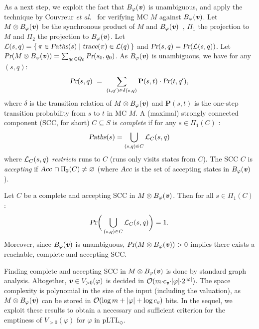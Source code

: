 \documentclass{llncs}
\newcommand{\Paths}{\mbox{\sl Paths}}
\def\Acc{\mbox{\sl Acc}}
\renewcommand{\Pr}{\mbox{\rm Pr}}
\renewcommand{\Pr}{\mbox{\sl Pr}}
\def\bfP{\mathbf{P}}
\newcommand{\set}[1]{\{ \, #1 \, \}}
\newcommand{\trace}{\mbox{\sl trace}}
\renewcommand{\L}{{\cal L}}
\renewcommand{\emptyset}{\varnothing}
\renewcommand{\a}[1]{\textbf{\textit{#1}}}
\newcommand{\ve}{{{\a v}}}
\newcommand{\de}{\Diamond}
\begin{document}
As a next step, we exploit the fact that $B_\varphi(\ve)$ is unambiguous, and apply the technique by Couvreur \emph{et al.}~\cite{CouvreurSahebSutre03} for verifying MC $M$ against $B_\varphi(\ve)$.
Let $M\otimes B_\varphi({\a v})$ be the synchronous product of $M$ and $B_\varphi({\a v})$~\cite{DBLP:books/daglib/0020348}, $\Pi_1$ the projection to $M$ and $\Pi_2$ the projection to $B_\varphi(\ve)$. 
Let $\L(s,q) =  \set{ \pi \in\Paths(s) \mid \trace(\pi) \in \L(q)}$ and $\Pr(s,q) = \Pr(\L(s,q))$. 
Let $\Pr(M \otimes B_\varphi(\ve)) = \sum_{q_0 \in Q_0} \Pr(s_0,q_0)$.
As $B_\varphi({\a v})$ is unambiguous, we have for any $(s,q)$:
$$
\Pr(s,q) \ = \ \sum_{(t,q')\in \delta(s,q)} \bfP(s,t) \cdot \Pr(t,q'),
$$ 
where $\delta$ is the transition relation of $M\otimes B_\varphi({\a v})$ and $\bfP(s,t)$ is the one-step transition probability from $s$ to $t$ in MC $M$. 
A (maximal) strongly connected component (SCC, for short) $C \subseteq S$ is \emph{complete} if for any $s \in \Pi_1(C)$ :
$$
\Paths(s) = \bigcup_{(s,q) \in C} \L_C(s,q)
$$ 
where $\L_C(s,q)$ \emph{restricts} runs to $C$ (runs only visits states from $C$). 
The SCC $C$ is \emph{accepting} if $\Acc \,\cap \Pi_2(C)\neq \emptyset$ (where $\Acc$ is the set of accepting states in $B_\varphi(\ve)$). 

\begin{proposition}
Let $C$ be a complete and accepting SCC in $M\otimes B_\varphi(\ve)$. 
Then for all $s\in \Pi_1(C)$:
$$ 
\Pr\bigg(\bigcup_{(s,q)\in C} \L_C(s,q)\bigg) = 1.
$$ 
Moreover, since $B_\varphi({\a v})$ is unambiguous, $\Pr(M\otimes B_\varphi({\a v})) >0$ implies there exists a reachable, complete and accepting SCC. 
\end{proposition}


Finding complete and accepting SCC in $M\otimes B_\varphi(\ve)$ is done by standard graph analysis. 
Altogether, ${{\a v}} \in V_{>0}(\varphi)$ is decided in ${\cal O}(m{\cdot}c_{{\a v}}{\cdot}|\varphi|{\cdot}2^{|\varphi|})$. 
The space complexity is polynomial in the size of the input (including the valuation), as $M\otimes B_\varphi({\a v})$ can be stored in $\mathcal{O}(\log m + |\varphi| + \log c_{{\a v}})$ bits.
In the sequel, we exploit these results to obtain a necessary and sufficient criterion for the emptiness of $V_{> 0}(\varphi)$ for $\varphi$ in  pLTL$_\de$.
\end{document}
